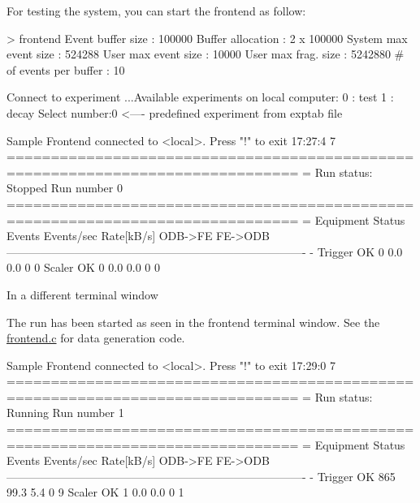 For testing the system, you can start the frontend as follow: 
\begin{DoxyCode}
  > frontend
  Event buffer size      :     100000
  Buffer allocation      : 2 x 100000
  System max event size  :     524288
  User max event size    :     10000
  User max frag. size    :     5242880
  # of events per buffer :     10
  
  Connect to experiment ...Available experiments on local computer:
  0 : test         
  1 : decay
  Select number:0                    <---- predefined experiment from exptab file
      

  Sample Frontend connected to <local>. Press "!" to exit                 17:27:4
      7
  ===============================================================================
      =
  Run status:   Stopped    Run number 0
  ===============================================================================
      =
  Equipment     Status     Events     Events/sec Rate[kB/s] ODB->FE    FE->ODB
  -------------------------------------------------------------------------------
      -
  Trigger       OK         0          0.0        0.0        0          0
  Scaler        OK         0          0.0        0.0        0          0
\end{DoxyCode}
 In a different terminal window 
 The run has been started as seen in the frontend terminal window. See the \hyperlink{frontend_8c}{frontend.c} for data generation code. 
\begin{DoxyCode}
  Sample Frontend connected to <local>. Press "!" to exit                 17:29:0
      7
  ===============================================================================
      =
  Run status:   Running    Run number 1
  ===============================================================================
      =
  Equipment     Status     Events     Events/sec Rate[kB/s] ODB->FE    FE->ODB
  -------------------------------------------------------------------------------
      -
  Trigger       OK         865        99.3       5.4        0          9
  Scaler        OK         1          0.0        0.0        0          1
\end{DoxyCode}


\par


